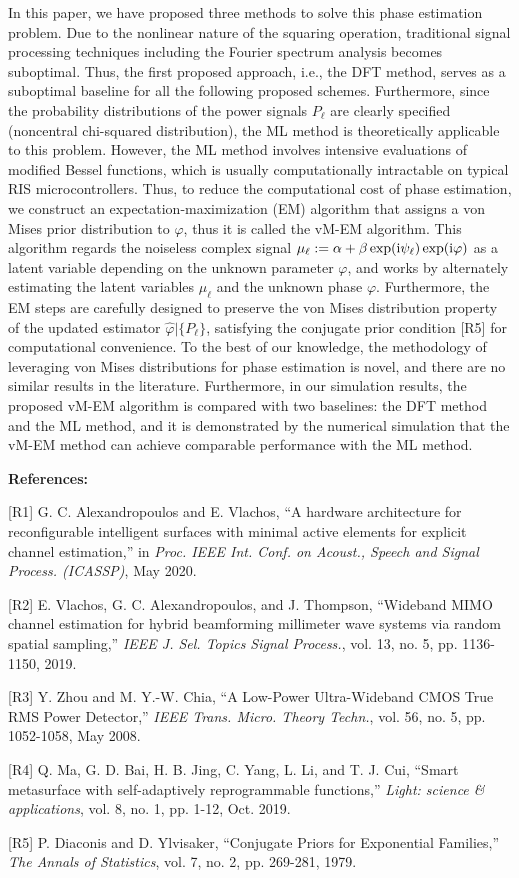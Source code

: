 \documentclass[a4paper,12pt]{article}
\def \ri {{\rm i}}
\begin{document}
{{\quad In this paper, we have proposed three methods to solve this phase estimation problem. Due to the nonlinear nature of the squaring operation, traditional signal processing techniques including the Fourier spectrum analysis becomes suboptimal. Thus, the first proposed approach, i.e., the DFT method, serves as a suboptimal baseline for all the following proposed schemes. Furthermore, since the probability distributions of the power signals $P_\ell$ are clearly specified (noncentral chi-squared distribution), the ML method is theoretically applicable to this problem. However, the ML method involves intensive evaluations of modified Bessel functions, which is usually computationally intractable on typical RIS microcontrollers. 
Thus, to reduce the computational cost of phase estimation, we construct an expectation-maximization (EM) algorithm that assigns a von Mises prior distribution to $\varphi$, thus it is called the vM-EM algorithm. 
This algorithm regards the noiseless complex signal $\mu_\ell := \alpha+\beta\exp(\ri\psi_\ell)\exp(\ri\varphi)$ as a latent variable depending on the unknown parameter $\varphi$, and works by alternately estimating the latent variables $\mu_\ell$ and the unknown phase $\varphi$. 
Furthermore, the EM steps are carefully designed to preserve the von Mises distribution property of the updated estimator $\hat{\varphi}|\{P_\ell\}$, satisfying the conjugate prior condition [R5] for computational convenience. 
To the best of our knowledge, the methodology of leveraging von Mises distributions for phase estimation is novel, and there are no similar results in the literature. 
Furthermore, in our simulation results, the proposed vM-EM algorithm is compared with two baselines: the DFT method and the ML method, and it is demonstrated by the numerical simulation that the vM-EM method can achieve comparable performance with the ML method. 

{\bf References:}

[R1] G. C. Alexandropoulos and E. Vlachos, ``A hardware architecture for reconfigurable intelligent surfaces with minimal active elements for explicit channel estimation,'' in {\it Proc. IEEE Int. Conf. on Acoust., Speech
and Signal Process. (ICASSP)}, May 2020. 

[R2] E. Vlachos, G. C. Alexandropoulos, and J. Thompson, ``Wideband MIMO channel estimation for hybrid beamforming millimeter wave systems via random spatial sampling,'' {\it IEEE J. Sel. Topics Signal Process.}, vol. 13, no. 5, pp. 1136-1150, 2019.

[R3] Y. Zhou and M. Y.-W. Chia, ``A Low-Power Ultra-Wideband CMOS True RMS Power Detector,'' {\it IEEE Trans. Micro. Theory Techn.}, vol. 56, no. 5, pp. 1052-1058, May 2008. 

[R4] Q. Ma, G. D. Bai, H. B. Jing, C. Yang, L. Li, and T. J. Cui, ``Smart metasurface with self-adaptively reprogrammable functions,'' {\it Light: science \& applications}, vol. 8, no. 1, pp. 1-12, Oct. 2019.

[R5] P. Diaconis and D. Ylvisaker, ``Conjugate Priors for Exponential Families,'' {\it The Annals of Statistics}, vol. 7, no. 2, pp. 269-281, 1979.


}}
\end{document}
